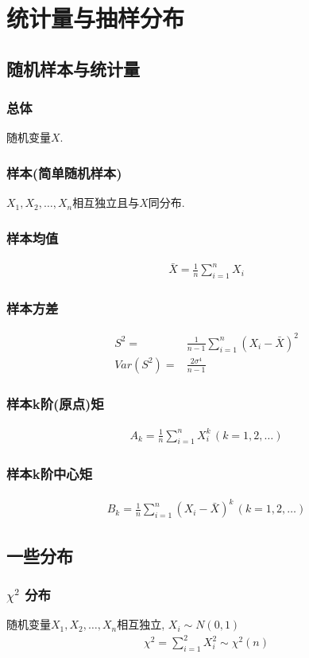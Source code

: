 \newpage
\section{统计量与抽样分布}

\subsection{随机样本与统计量}
\subsubsection{总体}随机变量$X$. 
\subsubsection{样本(简单随机样本)} $X_1,X_2,\dots,X_n$相互独立且与$X$同分布. 
\subsubsection{样本均值 }
\begin{align*}
    \bar{X}=\frac{1}{n}\sum_{i=1}^n X_i
\end{align*}
\subsubsection{样本方差}
\begin{align*}
    S^2=&\frac{1}{n-1}\sum_{i=1}^n \left(X_i-\bar{X}\right)^2\\
    Var(S^2)=&\frac{2\sigma^4}{n-1}
\end{align*}
\subsubsection{样本k阶(原点)矩}
\begin{align*}
    A_k=\frac{1}{n}\sum_{i=1}^n X_i^k\, (k=1,2,\dots)
\end{align*}
\subsubsection{样本k阶中心矩}
\begin{align*}
    B_k=\frac{1}{n}\sum_{i=1}^n \left(X_i-\bar{X}\right)^k\, (k=1,2,\dots)
\end{align*}

\subsection{一些分布}
\subsubsection{\texorpdfstring{$\chi^2 $}. 分布}
\begin{definition}
    随机变量$X_1,X_2,\dots,X_n$相互独立, $X_i\sim N(0,1)$
    \begin{align*}
        \chi^2=\sum_{i=1}^2 X_i^2 \sim \chi^2(n)
    \end{align*}
\end{definition}

